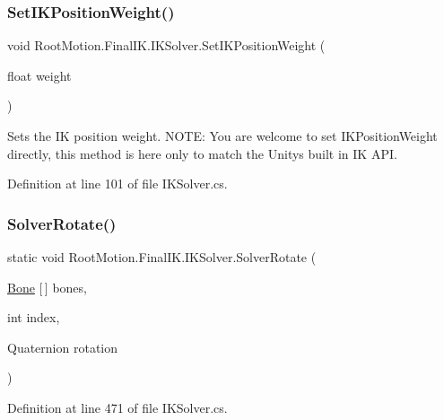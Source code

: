 \subsubsection{\texorpdfstring{Set\+I\+K\+Position\+Weight()}{SetIKPositionWeight()}}
{\footnotesize\ttfamily void Root\+Motion.\+Final\+I\+K.\+I\+K\+Solver.\+Set\+I\+K\+Position\+Weight (\begin{DoxyParamCaption}\item[{float}]{weight }\end{DoxyParamCaption})}



Sets the IK position weight. N\+O\+TE\+: You are welcome to set I\+K\+Position\+Weight directly, this method is here only to match the Unity\textquotesingle{}s built in IK A\+PI. 



Definition at line 101 of file I\+K\+Solver.\+cs.

\mbox{\label{class_root_motion_1_1_final_i_k_1_1_i_k_solver_afb1d9bbe43f8423813c731657eccfb3b}} 
\subsubsection{\texorpdfstring{Solver\+Rotate()}{SolverRotate()}}
{\footnotesize\ttfamily static void Root\+Motion.\+Final\+I\+K.\+I\+K\+Solver.\+Solver\+Rotate (\begin{DoxyParamCaption}\item[{\mbox{\hyperlink{class_root_motion_1_1_final_i_k_1_1_i_k_solver_1_1_bone}{Bone}} \mbox{[}$\,$\mbox{]}}]{bones,  }\item[{int}]{index,  }\item[{Quaternion}]{rotation }\end{DoxyParamCaption})\hspace{0.3cm}{\ttfamily [static]}}



Definition at line 471 of file I\+K\+Solver.\+cs.

\mbox{\label{class_root_motion_1_1_final_i_k_1_1_i_k_solver_a4a8f110f37d9b956d4bb2aff1232f1aa}} 
